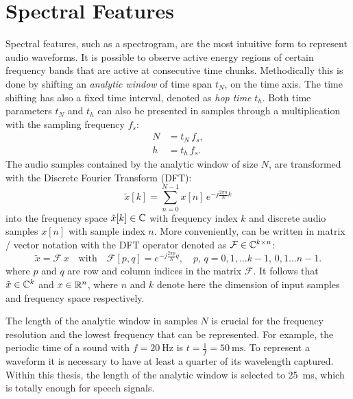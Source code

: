 
\section{Spectral Features}\label{sec:signal_spec}
\thesisStateReady
Spectral features, such as a spectrogram, are the most intuitive form to represent audio waveforms. 
It is possible to observe active energy regions of certain frequency bands that are active at consecutive time chunks.
Methodically this is done by shifting an \emph{analytic window} of time span $t_N$, on the time axis.
The time shifting has also a fixed time interval, denoted as \emph{hop time} $t_{h}$.
Both time parameters $t_N$ and $t_h$ can also be presented in samples through a multiplication with the sampling frequency $f_s$:
\begin{equation}
  \begin{split}
    N &= t_N \, f_s, \\
    h &= t_h \, f_s.
  \end{split}
\end{equation}
The audio samples contained by the analytic window of size $N$, are transformed with the Discrete Fourier Transform (DFT):
\begin{equation}\label{eq:signal_spec_dtft}
  \tilde{x}[k] = \sum_{n=0}^{N-1} x[n] \, e^{-j\frac{2 \pi n}{N}k}
\end{equation}
into the frequency space $\tilde{x}[k] \in \mathbb{C}$ with frequency index $k$ and discrete audio samples $x[n]$ with sample index $n$.
More conveniently,  can be written in matrix / vector notation with the DFT operator denoted as $\mathcal{F} \in \mathbb{C}^{k \times n}$:
\begin{equation}\label{eq:signal_spec_dtft_matrix}
  \tilde{x} = \mathcal{F}\, x \quad \mathrm{with} 
  \quad \mathcal{F}[p, q] = e^{-j\frac{2 \pi p}{N} q},
  \quad p,\, q = 0, 1, \dots k-1,\, 0, 1 \dots n-1.
\end{equation}
where $p$ and $q$ are row and column indices in the matrix $\mathcal{F}$.
It follows that $\tilde{x} \in \mathbb{C}^k$ and $x \in \mathbb{R}^n$, where $n$ and $k$ denote here the dimension of input samples and frequency space respectively.

The length of the analytic window in samples $N$ is crucial for the frequency resolution and the lowest frequency that can be represented.
For example, the periodic time of a sound with $f=\SI{20}{\hertz}$ is $t=\frac{1}{f} = \SI{50}{\milli\second}$.
To represent a waveform it is necessary to have at least a quarter of its wavelength captured.
Within this thesis, the length of the analytic window is selected to \SI{25}{\milli\second}, which is totally enough for speech signals.

